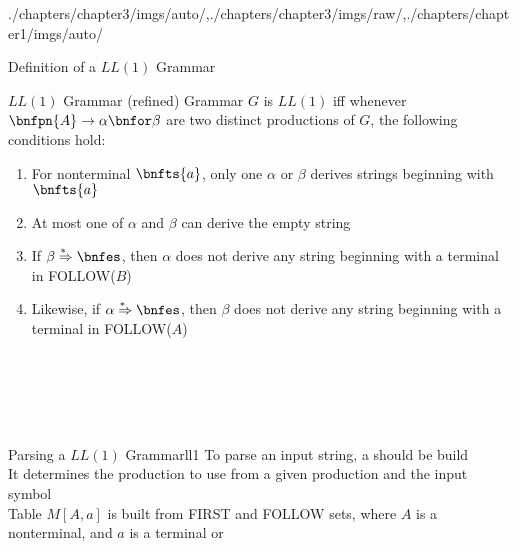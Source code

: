 \begin{graphicspathcontext}{{./chapters/chapter3/imgs/auto/},{./chapters/chapter3/imgs/raw/},{./chapters/chapter1/imgs/auto/}}
\begin{bibunit}[apalike]
\begin{frame}[t]{Definition of a $LL(1)$ Grammar}
	\begin{small}
		\begin{definitionblock}{$LL(1)$ Grammar (refined)}
			Grammar $G$ is $LL(1)$ iff whenever $\bnfpn{A} \bnfopo \alpha \bnfor \beta$ are two distinct productions of $G$, the following conditions hold:
				\begin{enumerate}
				\item For nonterminal $\bnfts{a}$, only one $\alpha$ or $\beta$ derives strings beginning with $\bnfts{a}$
				\item At most one of $\alpha$ and $\beta$ can derive the empty string
				\item If $\beta\seqderiv\bnfes$, then $\alpha$ does not derive any string beginning with a terminal in FOLLOW($B$)
				\item Likewise, if $\alpha\seqderiv\bnfes$, then $\beta$ does not derive any string beginning with a terminal in FOLLOW($A$)
				\end{enumerate}
		\end{definitionblock}
		\vspace{-.6cm}
		\begin{bnf}
			 \\
			\bnfalt*{\bnfes} \\
			 \\
			 \\
		\end{bnf}
	\end{small}
\end{frame}

\begin{leftlawnframe}{Parsing a $LL(1)$ Grammar}{ll1}
		To parse an input string, a  should be build \\[.2cm]
		It determines the production to use from a given production and the input symbol \\[.2cm]
		Table $M[A,a]$ is built from FIRST and FOLLOW sets, where $A$ is a nonterminal, and $a$ is a terminal or 
\end{leftlawnframe}


\end{bibunit}
\end{graphicspathcontext}
